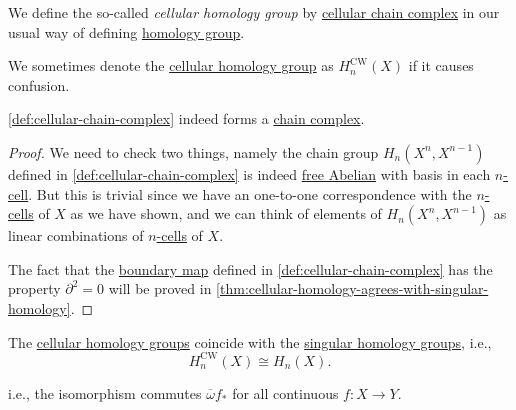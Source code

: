 \begin{definition}\label{def:cellular-homology-group}
	We define the so-called \emph{cellular homology group} by \hyperref[def:cellular-chain-complex]{cellular chain complex} in our usual way of defining
	\hyperref[def:homology-group]{homology group}.
\end{definition}
\begin{remark}
	We sometimes denote the \hyperref[def:cellular-homology-group]{cellular homology group} as \(H_n^{\mathrm{CW} }(X) \) if it causes confusion.
\end{remark}
\begin{theorem}\label{thm:lec-32}
	\autoref{def:cellular-chain-complex} indeed forms a \hyperref[def:chain-complex]{chain complex}.
\end{theorem}
\begin{proof}
	We need to check two things, namely the chain group \(H_n(X^n, X^{n-1} )\) defined in \autoref{def:cellular-chain-complex}
	is indeed \hyperref[def:free-Abelian-group]{free Abelian} with basis in each \hyperref[def:cell]{\(n\)-cell}. But this is trivial since we have
	an one-to-one correspondence with the \hyperref[def:cell]{\(n\)-cells} of \(X\) as we have shown, and we can think of elements of \(H_n(X^n, X^{n-1} )\)
	as linear combinations of \hyperref[def:cell]{\(n\)-cells} of \(X\).

	The fact that the \hyperref[def:boundary-homomorphism]{boundary map} defined in \autoref{def:cellular-chain-complex} has the property \(\partial ^{2} = 0\)
	will be proved in \autoref{thm:cellular-homology-agrees-with-singular-homology}.
\end{proof}
\begin{theorem}\label{thm:cellular-homology-agrees-with-singular-homology}
	The \hyperref[def:cellular-homology-group]{cellular homology groups} coincide with the \hyperref[def:singular-homology-group]{singular homology groups}, i.e.,
	\[
		H_n^{\mathrm{CW} }(X) \cong H_n(X).
	\]
\end{theorem}
\begin{note}
	i.e., the isomorphism commutes \(\overline{\omega} f_\ast\) for all continuous \(f\colon X\to Y\).
\end{note}

